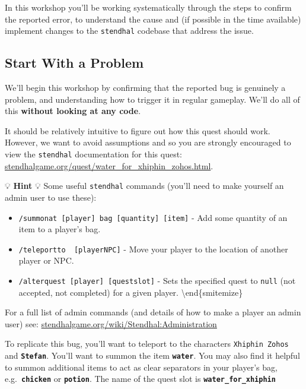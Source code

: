 \documentclass[
]{book}
\providecommand{\tightlist}{%
  \setlength{\itemsep}{0pt}\setlength{\parskip}{0pt}}
\begin{document}
In this workshop you'll be working systematically through the steps to confirm the reported error, to understand the cause and (if possible in the time available) implement changes to the \texttt{stendhal} codebase that address the issue.

\hypertarget{wheretostart}{%
\subsection{Start With a Problem}\label{wheretostart}}

We'll begin this workshop by confirming that the reported bug is genuinely a problem, and understanding how to trigger it in regular gameplay. We'll do all of this \textbf{without looking at any code}.

It should be relatively intuitive to figure out how this quest should work. However, we want to avoid assumptions and so you are strongly encouraged to view the \texttt{stendhal} documentation for this quest: \href{https://stendhalgame.org/quest/water_for_xhiphin_zohos.html}{stendhalgame.org/quest/water\_for\_xhiphin\_zohos.html}.

💡 \textbf{Hint} 💡
Some useful \texttt{stendhal} commands (you'll need to make yourself an admin user to use these):

\begin{itemize}
\tightlist
\item
  \texttt{/summonat\ {[}player{]}\ bag\ {[}quantity{]}\ {[}item{]}} - Add some quantity of an item to a player's bag.
\item
  \texttt{/teleportto\ \ {[}player\textbar{}NPC{]}} - Move your player to the location of another player or NPC.
\item
  \texttt{/alterquest\ {[}player{]}\ {[}questslot{]}} - Sets the specified quest to \texttt{null} (not accepted, not completed) for a given player.
  \textbackslash end\{smitemize\}
\end{itemize}

For a full list of admin commands (and details of how to make a player an admin user) see: \href{https://stendhalgame.org/wiki/Stendhal:Administration}{stendhalgame.org/wiki/Stendhal:Administration}

To replicate this bug, you'll want to teleport to the characters \texttt{Xhiphin\ Zohos} and \textbf{\texttt{Stefan}}. You'll want to summon the item \textbf{\texttt{water}}. You may also find it helpful to summon additional items to act as clear separators in your player's bag, e.g.~\textbf{\texttt{chicken}} or \textbf{\texttt{potion}}. The name of the quest slot is \textbf{\texttt{water\_for\_xhiphin}}
\end{document}
